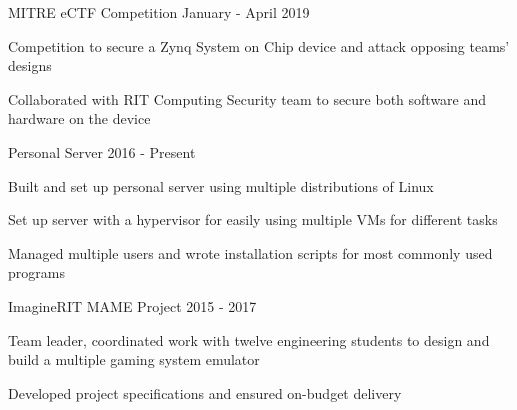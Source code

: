 \begin{cventries}
%

  \cvproject
	{MITRE eCTF Competition}
	{January - April 2019}
	{
		\begin{cvitems}
		\item {Competition to secure a Zynq System on Chip device and attack opposing teams' designs}
		\item {Collaborated with RIT Computing Security team to secure both software and hardware on the device}
		\end{cvitems}
	}

  \cvproject
	{Personal Server}
	{2016 - Present}
    {
      \begin{cvitems}
        \item {Built and set up personal server using multiple distributions of Linux}
		\item {Set up server with a hypervisor for easily using multiple VMs for different tasks}
		\item {Managed multiple users and wrote installation scripts for most commonly used programs}
      \end{cvitems}
    }

	\cvproject
	{ImagineRIT MAME Project}
	{2015 - 2017}
	{
		\begin{cvitems}
		\item{Team leader, coordinated work with twelve engineering students to design and build a multiple gaming system emulator}
		\item{Developed project specifications and ensured on-budget delivery}
		\end{cvitems}
	}
\end{cventries}
